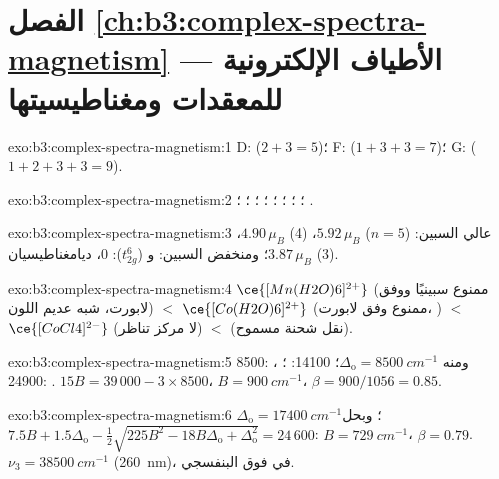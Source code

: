 \section*{الفصل \ref{ch:b3:complex-spectra-magnetism} --- الأطياف الإلكترونية للمعقدات ومغناطيسيتها}

\begin{solution}{exo:b3:complex-spectra-magnetism:1}
D:  ($2 + 3 = 5$)؛ F:  ($1 + 3 + 3 = 7$)؛ G: 
($1 + 2 + 3 + 3 = 9$).
\end{solution}

\begin{solution}{exo:b3:complex-spectra-magnetism:2}
؛ ؛ ؛ ؛ ؛ ؛ ؛ ؛ .
\end{solution}

\begin{solution}{exo:b3:complex-spectra-magnetism:3}
عالي السبين:  ($n = 5$) $5.92\,\mu_B$،  (4) $4.90\,\mu_B$،  (3) $3.87\,\mu_B$؛ ومنخفض السبين:  
و ($t_{2g}^6$): 0، ديامغناطيسيان.
\end{solution}

\begin{solution}{exo:b3:complex-spectra-magnetism:4}
$\ce{[Mn(H2O)6]^{2+}}$ (ممنوع سبينيًا ووفق لابورت، شبه عديم اللون) $<$ $\ce{[Co(H2O)6]^{2+}}$
(ممنوع وفق لابورت، ) $<$ $\ce{[CoCl4]^{2-}}$ (لا مركز تناظر) $<$  (نقل شحنة
مسموح).
\end{solution}

\begin{solution}{exo:b3:complex-spectra-magnetism:5}
8500: ، ومنه $\Delta_{\mathrm o} = \qty{8500}{cm^{-1}}$؛ 14100: ؛ 24900: .
$15B = 39\,000 - 3 \times 8500$، $B = \qty{900}{cm^{-1}}$، $\beta = 900/1056 = 0.85$.
\end{solution}

\begin{solution}{exo:b3:complex-spectra-magnetism:6}
$\Delta_{\mathrm o} = \qty{17400}{cm^{-1}}$؛ وبحل $7.5B + 1.5\Delta_{\mathrm o} - \frac12\sqrt{225B^2 - 18B\Delta_{\mathrm o} + \Delta_{\mathrm o}^2} = 24\,600$: $B = \qty{729}{cm^{-1}}$،
$\beta = 0.79$. $\nu_3 = \qty{38500}{cm^{-1}}$ (\qty{260}{nm})، في فوق البنفسجي.
\end{solution}

